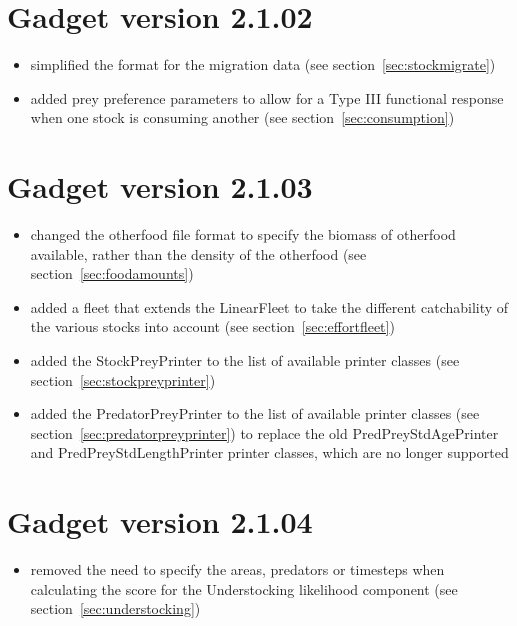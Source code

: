 \documentclass[10pt,twoside]{book}
\begin{document}
\section{Gadget version 2.1.02}\label{sec:v2102}
\begin{itemize}
\item simplified the format for the migration data (see section~\ref{sec:stockmigrate})
\item added prey preference parameters to allow for a Type III functional response when one stock is consuming another (see section~\ref{sec:consumption})
\end{itemize}

\section{Gadget version 2.1.03}\label{sec:v2103}
\begin{itemize}
\item changed the otherfood file format to specify the biomass of otherfood available, rather than the density of the otherfood (see section~\ref{sec:foodamounts})
\item added a fleet that extends the LinearFleet to take the different catchability of the various stocks into account (see section~\ref{sec:effortfleet})
\item added the StockPreyPrinter to the list of available printer classes (see section~\ref{sec:stockpreyprinter})
\item added the PredatorPreyPrinter to the list of available printer classes (see section~\ref{sec:predatorpreyprinter}) to replace the old PredPreyStdAgePrinter and PredPreyStdLengthPrinter printer classes, which are no longer supported
\end{itemize}

\section{Gadget version 2.1.04}\label{sec:v2104}
\begin{itemize}
\item removed the need to specify the areas, predators or timesteps when calculating the score for the Understocking likelihood component (see section~\ref{sec:understocking})
\end{itemize}
\end{document}
